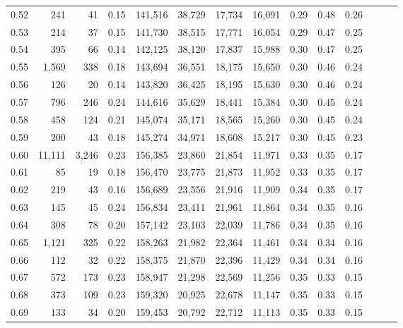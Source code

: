 \begin{tabular}{rrrrrrrrrrrrrr}
0.52 &     241 &     41 &  0.15 &  141,516 &   38,729 &  17,734 &  16,091 &  0.29 &  0.48 &      0.26 \\
0.53 &     214 &     37 &  0.15 &  141,730 &   38,515 &  17,771 &  16,054 &  0.29 &  0.47 &      0.25 \\
0.54 &     395 &     66 &  0.14 &  142,125 &   38,120 &  17,837 &  15,988 &  0.30 &  0.47 &      0.25 \\
0.55 &   1,569 &    338 &  0.18 &  143,694 &   36,551 &  18,175 &  15,650 &  0.30 &  0.46 &      0.24 \\
0.56 &     126 &     20 &  0.14 &  143,820 &   36,425 &  18,195 &  15,630 &  0.30 &  0.46 &      0.24 \\
0.57 &     796 &    246 &  0.24 &  144,616 &   35,629 &  18,441 &  15,384 &  0.30 &  0.45 &      0.24 \\
0.58 &     458 &    124 &  0.21 &  145,074 &   35,171 &  18,565 &  15,260 &  0.30 &  0.45 &      0.24 \\
0.59 &     200 &     43 &  0.18 &  145,274 &   34,971 &  18,608 &  15,217 &  0.30 &  0.45 &      0.23 \\
0.60 &  11,111 &  3,246 &  0.23 &  156,385 &   23,860 &  21,854 &  11,971 &  0.33 &  0.35 &      0.17 \\
0.61 &      85 &     19 &  0.18 &  156,470 &   23,775 &  21,873 &  11,952 &  0.33 &  0.35 &      0.17 \\
0.62 &     219 &     43 &  0.16 &  156,689 &   23,556 &  21,916 &  11,909 &  0.34 &  0.35 &      0.17 \\
0.63 &     145 &     45 &  0.24 &  156,834 &   23,411 &  21,961 &  11,864 &  0.34 &  0.35 &      0.16 \\
0.64 &     308 &     78 &  0.20 &  157,142 &   23,103 &  22,039 &  11,786 &  0.34 &  0.35 &      0.16 \\
0.65 &   1,121 &    325 &  0.22 &  158,263 &   21,982 &  22,364 &  11,461 &  0.34 &  0.34 &      0.16 \\
0.66 &     112 &     32 &  0.22 &  158,375 &   21,870 &  22,396 &  11,429 &  0.34 &  0.34 &      0.16 \\
0.67 &     572 &    173 &  0.23 &  158,947 &   21,298 &  22,569 &  11,256 &  0.35 &  0.33 &      0.15 \\
0.68 &     373 &    109 &  0.23 &  159,320 &   20,925 &  22,678 &  11,147 &  0.35 &  0.33 &      0.15 \\
0.69 &     133 &     34 &  0.20 &  159,453 &   20,792 &  22,712 &  11,113 &  0.35 &  0.33 &      0.15 \\

\end{tabular}
